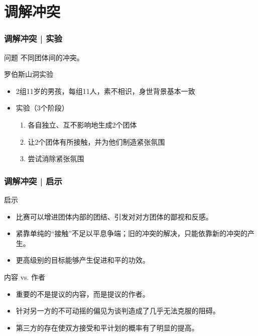 \section{调解冲突}
\begin{frame}
  \frametitle{调解冲突 | 实验}
  \begin{block}{问题}
    不同团体间的冲突。
  \end{block}
  \pause
  \begin{block}{罗伯斯山洞实验}
    \begin{itemize}
      \item 2组11岁的男孩，每组11人，素不相识，身世背景基本一致
      \item 实验（3个阶段）
        \begin{enumerate}
          \item 各自独立、互不影响地生成2个团体
          \item 让2个团体有所接触，并为他们制造紧张氛围
          \item 尝试消除紧张氛围
        \end{enumerate}
    \end{itemize}
  \end{block}
\end{frame}

\begin{frame}
  \frametitle{调解冲突 | 启示}
  \begin{block}{启示}
    \begin{itemize}
      \item 比赛可以增进团体内部的团结、引发对对方团体的鄙视和反感。
      \item 紧靠单纯的“接触”不足以平息争端；旧的冲突的解决，只能依靠新的冲突的产生。
      \item 更高级别的目标能够产生促进和平的功效。
    \end{itemize}
  \end{block}
  \pause
  \begin{block}{内容 vs. 作者}
    \begin{itemize}
      \item 重要的不是提议的内容，而是提议的作者。
      \item 针对另一方的不可动摇的偏见为谈判造成了几乎无法克服的阻碍。
      \item 第三方的存在使双方接受和平计划的概率有了明显的提高。
    \end{itemize}
  \end{block}
\end{frame}

